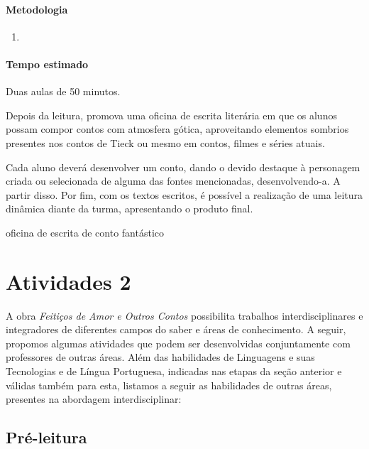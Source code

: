 \documentclass[11pt]{extarticle}
\begin{document}
\paragraph{Metodologia}
\begin{enumerate}

\item 

\end{enumerate}

\paragraph{Tempo estimado} Duas aulas de 50 minutos. 

Depois da leitura, promova uma oficina de escrita literária
em que os alunos possam compor contos com atmosfera gótica, aproveitando
elementos sombrios presentes nos contos de Tieck ou mesmo em contos,
filmes e séries atuais.

Cada aluno deverá desenvolver um conto, dando o devido destaque à
personagem criada ou selecionada de alguma das fontes mencionadas,
desenvolvendo-a. A partir disso. Por fim, com os textos escritos, é
possível a realização de uma leitura dinâmica diante da turma,
apresentando o produto final.

oficina de escrita de conto fantástico


\section{Atividades 2}




A obra \emph{Feitiços de Amor e Outros Contos} possibilita trabalhos
interdisciplinares e integradores de diferentes campos do saber e áreas
de conhecimento. A seguir, propomos algumas atividades que podem ser
desenvolvidas conjuntamente com professores de outras áreas. Além das
habilidades de Linguagens e suas Tecnologias e de Língua Portuguesa,
indicadas nas etapas da seção anterior e válidas também para esta,
listamos a seguir as habilidades de outras áreas, presentes na abordagem
interdisciplinar:

\subsection{Pré-leitura}
\end{document}
